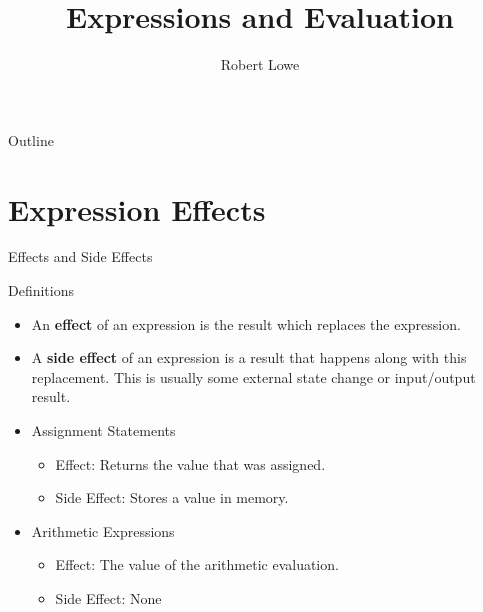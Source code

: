 \documentclass[handout]{beamer}
\title{Expressions and Evaluation}
\author{Robert Lowe}
\institute[Southeast Missouri State University] %
{
  Department of Computer Science\\
  Southeast Missouri State University
}
\date[]{}
\begin{document}
\begin{frame}
  \titlepage
\end{frame}

\begin{frame}{Outline}
  \tableofcontents
\end{frame}





\section{Expression Effects}
\begin{frame}{Effects and Side Effects}
    \begin{block}{Definitions}
        \begin{itemize} 
            \item An \textbf{effect} of an expression is the result which replaces the expression.
            \item A \textbf{side effect} of an expression is a result that happens along with this replacement. This is usually some external state change or input/output result.
        \end{itemize}
    \end{block}
    \begin{itemize}
        \item Assignment Statements
        \begin{itemize}
            \item Effect: Returns the value that was assigned.
            \item Side Effect: Stores a value in memory.
        \end{itemize}
        \item Arithmetic Expressions
        \begin{itemize}
            \item Effect: The value of the arithmetic evaluation.
            \item Side Effect: None
        \end{itemize}
    \end{itemize}
\end{frame}
\end{document}

